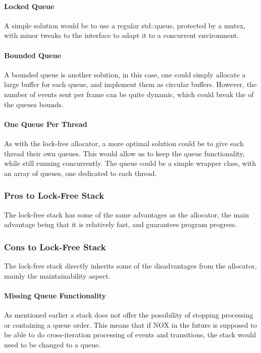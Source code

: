 \paragraph{Locked Queue}
A simple solution would be to use a regular std::queue, protected by a mutex,
with minor tweaks to the interface to adapt it to a concurrent environment.

\paragraph{Bounded Queue}
A bounded queue is another solution, in this case, one could simply allocate a large buffer for each queue, and implement them as circular buffers.
However, the number of events sent per frame can be quite dynamic, which could break the of the queues bounds.

\paragraph{One Queue Per Thread}
As with the lock-free allocator, a more optimal solution could be to give each thread
their own queues. 
This would allow us to keep the queue functionality, while still running concurrently. 
The queue could be a simple wrapper class, with an array of queues, one dedicated to each thread.

\subsubsection{Pros to Lock-Free Stack}
The lock-free stack has some of the same advantages as the allocator,
the main advantage being that it is relatively fast, and guarantees program progress.

\subsubsection{Cons to Lock-Free Stack}
The lock-free stack directly inherits some of the disadvantages from the allocator,
mainly the maintainability aspect.

\paragraph{Missing Queue Functionality}
As mentioned earlier a stack does not offer the possibility of stopping processing or containing a queue order.
This means that if NOX in the future is supposed to be able to do cross-iteration processing of events and transitions, the stack would need to be changed to a queue.

